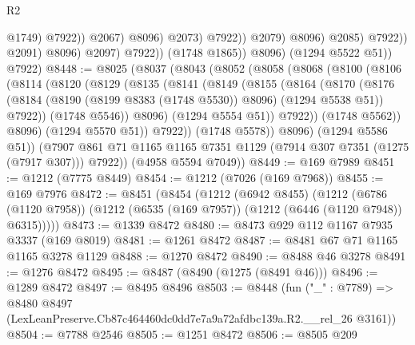 \begin{lexlean}{R2}
\begin{coremodule}
                                                @1749)
                                              @7922))
                                          @2067)
                                        @8096)
                                      @2073)
                                    @7922))
                                @2079)
                              @8096)
                            @2085)
                          @7922))
                      @2091)
                    @8096)
                  @2097)
                @7922))
            (@1748 @1865))
          @8096)
        (@1294 @5522 @51))
      @7922)
@8448 := @8025
    (@8037
      (@8043
        (@8052
          (@8058
            (@8068
              (@8100
                (@8106
                  (@8114
                    (@8120
                      (@8129
                        (@8135
                          (@8141
                            (@8149
                              (@8155
                                (@8164
                                  (@8170
                                    (@8176
                                      (@8184
                                        (@8190 (@8199 @8383 (@1748 @5530)) @8096)
                                        (@1294 @5538 @51))
                                      @7922))
                                  (@1748 @5546))
                                @8096)
                              (@1294 @5554 @51))
                            @7922))
                        (@1748 @5562))
                      @8096)
                    (@1294 @5570 @51))
                  @7922))
              (@1748 @5578))
            @8096)
          (@1294 @5586 @51))
        (@7907 @861 @71 @1165 @1165 @7351 @1129 (@7914 @307 @7351 (@1275 (@7917 @307))) @7922))
      (@4958 @5594 @7049))
@8449 := @169 @7989
@8451 := @1212 (@7775 @8449)
@8454 := @1212 (@7026 (@169 @7968))
@8455 := @169 @7976
@8472 := @8451
    (@8454
      (@1212
        (@6942 @8455)
        (@1212
          (@6786 (@1120 @7958))
          (@1212 (@6535 (@169 @7957)) (@1212 (@6446 (@1120 @7948)) @6315)))))
@8473 := @1339 @8472
@8480 := @8473 @929 @112 @1167 @7935 @3337 (@169 @8019)
@8481 := @1261 @8472
@8487 := @8481 @67 @71 @1165 @1165 @3278 @1129
@8488 := @1270 @8472
@8490 := @8488 @46 @3278
@8491 := @1276 @8472
@8495 := @8487 (@8490 (@1275 (@8491 @46)))
@8496 := @1289 @8472
@8497 := @8495 @8496
@8503 := @8448
    (fun ("_" : @7789) =>
    @8480 @8497 (LexLeanPreserve.Cb87c464460dc0dd7e7a9a72afdbc139a.R2.__rel_26 @3161))
@8504 := @7788 @2546
@8505 := @1251 @8472
@8506 := @8505 @209

\end{coremodule}
\end{lexlean}
